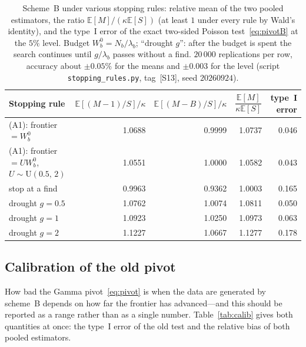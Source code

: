 \documentclass[11pt,a4paper]{article}
\theoremstyle{plain}
\theoremstyle{remark}
\begin{document}
\begin{table}[t]
\centering
\caption{Scheme~B under various stopping rules: relative mean of the two pooled
estimators, the ratio $\mathbb E[M]/(\kappa\mathbb E[S])$ (at least $1$ under every
rule by Wald's identity), and the type~I error of the exact two-sided Poisson
test~\eqref{eq:pivotB} at the $5\%$ level. Budget $W^0_b=N_b/\lambda_b$;
``drought $g$'': after the budget is spent the search continues until
$g/\lambda_b$ passes without a find. $20\,000$ replications per row, accuracy
about $\pm0.05\%$ for the means and $\pm0.003$ for the level (script
\texttt{stopping\_rules.py}, tag~[S13], seed $20260924$).}
\label{tab:stop}
\small
\begin{tabular}{lrrrr}
\toprule
Stopping rule & $\mathbb E[(M{-}1)/S]/\kappa$ & $\mathbb E[(M{-}B)/S]/\kappa$
& $\dfrac{\mathbb E[M]}{\kappa\mathbb E[S]}$ & type~I error\\
\midrule
(A1): frontier $=W^0_b$ & 1.0688 & 0.9999 & 1.0737 & 0.046\\
(A1): frontier $=UW^0_b$, $U\sim\mathrm U(0.5,\,2)$ & 1.0551 & 1.0000 & 1.0582 & 0.043\\
stop at a find & 0.9963 & 0.9362 & 1.0003 & 0.165\\
drought $g=0.5$ & 1.0762 & 1.0074 & 1.0811 & 0.050\\
drought $g=1$ & 1.0923 & 1.0250 & 1.0973 & 0.063\\
drought $g=2$ & 1.1227 & 1.0667 & 1.1277 & 0.178\\
\bottomrule
\end{tabular}
\end{table}

\subsection{Calibration of the old pivot}\label{sec:calib}

How bad the Gamma pivot~\eqref{eq:pivot} is when the data are generated by
scheme~B depends on how far the frontier has advanced---and this should be
reported as a range rather than as a single number. Table~\ref{tab:calib} gives
both quantities at once: the type~I error of the old test and the relative bias
of both pooled estimators.
\end{document}
